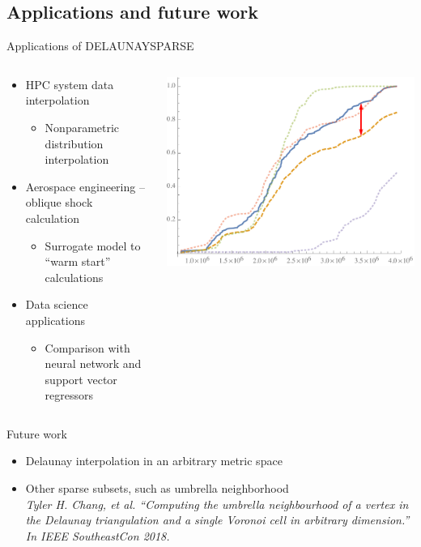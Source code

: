 \documentclass[xcolor=dvipsnames]{beamer}
\begin{document}
\subsection{Applications and future work}
\begin{frame}{Applications of DELAUNAYSPARSE}
\begin{columns}
\begin{column}{.48\textwidth}
\begin{itemize}
\item HPC system data interpolation
\begin{itemize}
\item Nonparametric distribution interpolation
\end{itemize}
\item Aerospace engineering -- oblique shock calculation
\begin{itemize}
\item Surrogate model to ``warm start'' calculations
\end{itemize}
\item Data science applications
\begin{itemize}
\item Comparison with neural network and support vector regressors
\end{itemize}
\end{itemize}
\end{column}
\begin{column}{.48\textwidth}
\includegraphics[width=\textwidth]{delaunay-dist-ex.pdf}
\end{column}
\end{columns}
\end{frame}
\begin{frame}{Future work}
\begin{itemize}
\item Delaunay interpolation in an arbitrary metric space
\item Other sparse subsets, such as umbrella neighborhood\\
{\it \small Tyler H. Chang, et al. 
``Computing the umbrella neighbourhood of a vertex in the Delaunay 
triangulation and a single Voronoi cell in arbitrary dimension.''
In IEEE SoutheastCon 2018.}
\end{itemize}
\end{frame}
\end{document}
